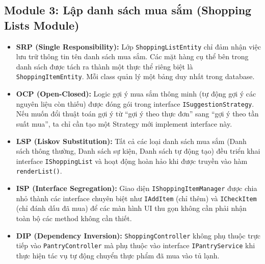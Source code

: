 \documentclass[12pt,a4paper]{article}
\begin{document}
\subsection{Module 3: Lập danh sách mua sắm (Shopping Lists Module)}
\begin{itemize}
    \item \textbf{SRP (Single Responsibility):} Lớp \texttt{ShoppingListEntity} chỉ đảm nhận việc lưu trữ thông tin tên danh sách mua sắm. Các mặt hàng cụ thể bên trong danh sách được tách ra thành một thực thể riêng biệt là \texttt{ShoppingItemEntity}. Mỗi class quản lý một bảng duy nhất trong database.
    \item \textbf{OCP (Open-Closed):} Logic gợi ý mua sắm thông minh (tự động gợi ý các nguyên liệu còn thiếu) được đóng gói trong interface \texttt{ISuggestionStrategy}. Nếu muốn đổi thuật toán gợi ý từ ``gợi ý theo thực đơn'' sang ``gợi ý theo tần suất mua'', ta chỉ cần tạo một Strategy mới implement interface này.
    \item \textbf{LSP (Liskov Substitution):} Tất cả các loại danh sách mua sắm (Danh sách thông thường, Danh sách sự kiện, Danh sách tự động tạo) đều triển khai interface \texttt{IShoppingList} và hoạt động hoàn hảo khi được truyền vào hàm \texttt{renderList()}.
    \item \textbf{ISP (Interface Segregation):} Giao diện \texttt{IShoppingItemManager} được chia nhỏ thành các interface chuyên biệt như \texttt{IAddItem} (chỉ thêm) và \texttt{ICheckItem} (chỉ đánh dấu đã mua) để các màn hình UI thu gọn không cần phải nhận toàn bộ các method không cần thiết.
    \item \textbf{DIP (Dependency Inversion):} \texttt{ShoppingController} không phụ thuộc trực tiếp vào \texttt{PantryController} mà phụ thuộc vào interface \texttt{IPantryService} khi thực hiện tác vụ tự động chuyển thực phẩm đã mua vào tủ lạnh.
\end{itemize}
\end{document}
